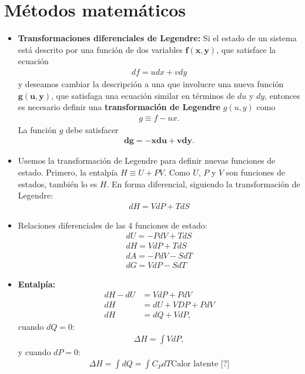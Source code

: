 \section{Métodos matemáticos}
\begin{itemize}
\item \textbf{Transformaciones diferenciales de Legendre:} 
Si el estado de un sistema está descrito por una función 
de dos variables $\mathbf{f(x,y)}$, que satisface la ecuación
\begin{align}
df=udx+vdy
\label{eq:df-Legendre}	
\end{align}
y deseamos cambiar la descripción a una que involucre
una nueva función $\mathbf{g(u,y)}$, que satisfaga una 
ecuación similar en términos de $du$ y $dy$, entonces
es necesario definir una \textbf{transformación
de Legendre} $g(u,y)$ como 
\begin{align}
g\equiv f-ux.
\label{eq:Legendre-transformation}
\end{align}
La función $g$ debe satisfacer
\begin{align}
\mathbf{dg=-xdu+vdy}.
\end{align}
\item Usemos la transformación de Legendre para definir
nuevas funciones de estado. Primero, la entalpía $H\equiv U+PV$.
Como $U$, $P$ y $V$ son funciones de estados, también lo es $H$.
En forma diferencial, siguiendo la transformación de Legendre:
\begin{align}
dH=VdP+TdS
\end{align}
\item Relaciones diferenciales de las 4 funciones de estado:
\begin{align}
dU = -PdV+TdS\nonumber\\
dH=VdP+TdS \label{eq:diff-form-eq-state}\\
dA=-PdV-SdT\nonumber\\
dG=VdP-SdT\nonumber
\end{align}
\item \textbf{Entalpía:}  
\begin{align*}
dH-dU&=VdP+PdV\\
dH&=dU+VDP+PdV\\
dH&=dQ+VdP,
\end{align*}
cuando $dQ=0$:
\begin{align*}
\Delta H=\int VdP,
\end{align*}
y cuando $dP=0$:
\begin{align*}
\Delta H=\int dQ=\int C_PdT \text{Calor latente [?]}
\end{align*}

\end{itemize}

